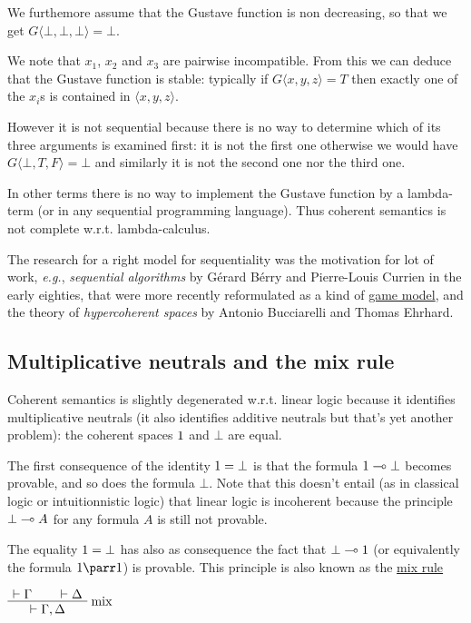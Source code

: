 We furthemore assume that the Gustave function is non decreasing, so
that we get \(G\langle\bot,\bot,\bot\rangle = \bot\).

We note that \(x_1\), \(x_2\) and \(x_3\) are pairwise incompatible.
From this we can deduce that the Gustave function is stable: typically
if \(G\langle x,y,z\rangle = T\) then exactly one of the \(x_i\)s is
contained in \(\langle x, y, z\rangle\).

However it is not sequential because there is no way to determine which
of its three arguments is examined first: it is not the first one
otherwise we would have \(G\langle\bot, T, F\rangle = \bot\) and
similarly it is not the second one nor the third one.

In other terms there is no way to implement the Gustave function by a
lambda-term (or in any sequential programming language). Thus coherent
semantics is not complete w.r.t. lambda-calculus.

The research for a right model for sequentiality was the motivation for
lot of work, \emph{e.g.}, \emph{sequential algorithms} by Gérard Bérry
and Pierre-Louis Currien in the early eighties, that were more recently
reformulated as a kind of \href{Game_semantics}{game model}, and the
theory of \emph{hypercoherent spaces} by Antonio Bucciarelli and Thomas
Ehrhard.

\subsection{Multiplicative neutrals and the mix rule}\label{multiplicative-neutrals-and-the-mix-rule}

Coherent semantics is slightly degenerated w.r.t. linear logic because
it identifies multiplicative neutrals (it also identifies additive
neutrals but that's yet another problem): the coherent spaces \(1\)
and \(\bot\) are equal.

The first consequence of the identity \(1 = \bot\) is that the
formula \(1\multimap\bot\) becomes provable, and so does the formula
\(\bot\). Note that this doesn't entail (as in classical logic or
intuitionnistic logic) that linear logic is incoherent because the
principle \(\bot\multimap A\) for any formula \(A\) is still not provable.

The equality \(1 = \bot\) has also as consequence the fact that
\(\bot\multimap1\) (or equivalently the formula \(\one\parr\one\)) is
provable. This principle is also known as the \href{Mix}{mix rule}

\(\AxRule{\vdash \Gamma}
\AxRule{\vdash \Delta}
\LabelRule{\rulename{mix}}
\BinRule{\vdash \Gamma,\Delta}
\DisplayProof\)


